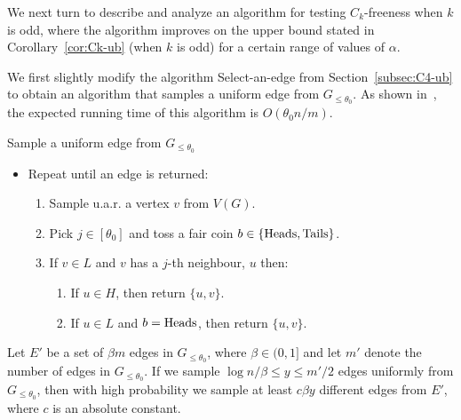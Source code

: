 \bigskip
We next turn to describe and analyze an algorithm for testing $C_k$-freeness when $k$ is odd, where the algorithm improves on the upper bound stated in Corollary~\ref{cor:Ck-ub} (when $k$ is odd) for a certain range of values of $\alpha$. %

\medskip
We first slightly modify the algorithm Select-an-edge from Section~\ref{subsec:C4-ub} to obtain an algorithm that samples a uniform edge from $G_{\leq \theta_0}$. As shown in~\cite{Reut}, the expected running time of this algorithm is $O(\theta_0 n/ m)$.

\medskip
\textsf{Sample a uniform edge from $G_{\leq\theta_0}$}
\begin{itemize}
\item Repeat until an edge is returned:
\begin{enumerate}
\item Sample u.a.r. a vertex $v$ from $V(G)$.
\item Pick $j\in [\theta_0]$ and toss a fair coin $b\in \{\rm{Heads}, \rm{Tails}\}$.
\item If $v\in L$ and $v$ has a $j$-th neighbour, $u$ then:
\begin{enumerate}
\item If $u \in H$, then return $\{u,v\}$.
\item If $u \in L$ and $b=\rm{Heads}$, then return $\{u,v\}$.
\end{enumerate}
\end{enumerate}
\end{itemize}


\begin{claim}\label{clm:sampleedges}
Let $E'$ be a set of $\beta m$ edges in $G_{\leq \theta_0}$, where $\beta \in (0, 1]$ and let $m'$ denote the number of edges in $G_{\leq \theta_0}$. If we sample $\log n/\beta  \leq y \leq m'/2$ edges uniformly from $G_{\leq \theta_0}$, then with high probability we sample at least $c \beta y$ different edges from $E'$, where $c$ is an absolute constant.
\end{claim}


